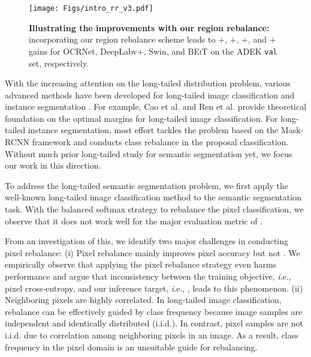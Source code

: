 \documentclass[final]{cvpr}
\begin{document}
\begin{figure}[t]
\begin{center}
\hspace{-7mm}
\texttt{[image: Figs/intro\_rr\_v3.pdf]}
\caption{\textbf{Illustrating the improvements with our region rebalance:}
incorporating our region rebalance scheme leads to +, +, +, and + gains for OCRNet, DeepLabv+, Swin, and \textsc{BEiT} on the ADEK \texttt{val} set, respectively.}
\label{fig:comparison_ade20k}
\end{center}
\vspace{-0.3in}
\end{figure}


With the increasing attention on the long-tailed distribution problem, various advanced methods have been developed for long-tailed image classification \cite{buda2018systematic,huang2016learning,DBLP:conf/cvpr/CuiJLSB19, he2009learning,chawla2002smote,DBLP:conf/nips/RenYSMZYL20,DBLP:conf/iclr/KangXRYGFK20, DBLP:journals/corr/abs-2010-01809, DBLP:journals/corr/abs-2101-10633, DBLP:conf/nips/TangHZ20, Zhong_2021_CVPR,cui2021parametric} and instance segmentation \cite{tan2020eql, li2020overcoming, wang2021seesaw}.
For example, Cao et al. \cite{ldam} and Ren et al. \cite{DBLP:conf/nips/RenYSMZYL20} provide theoretical foundation on the optimal margins for long-tailed image classification. For long-tailed instance segmentation, most effort tackles the problem based on the Mask-RCNN framework \cite{he2017mask} and conducts class rebalance in the proposal classification.
Without much prior long-tailed study for semantic segmentation yet, we focus our work in this direction.

To address the long-tailed semantic segmentation problem, we first apply the well-known long-tailed image classification method to the semantic segmentation task. With the balanced softmax strategy \cite{DBLP:conf/nips/RenYSMZYL20} to rebalance the pixel
classification, we observe that it does not work well for the major evaluation metric of .

From an investigation of this, we identify two major challenges in conducting pixel rebalance:
(i) Pixel rebalance mainly improves pixel accuracy but not .
We empirically observe that applying the pixel rebalance strategy even harms  performance and argue that inconsistency between the training objective, {\textit i.e.}, pixel cross-entropy, and our inference target, {\textit i.e.}, , leads to this phenomenon.
(ii) Neighboring pixels are highly correlated. In long-tailed image classification, rebalance can be effectively guided by class frequency because image samples are independent and identically distributed (i.i.d.). In contrast, pixel samples are not i.i.d. due to correlation among neighboring pixels in an image. As a result, class frequency in the pixel domain is an unsuitable guide for rebalancing.
\end{document}
